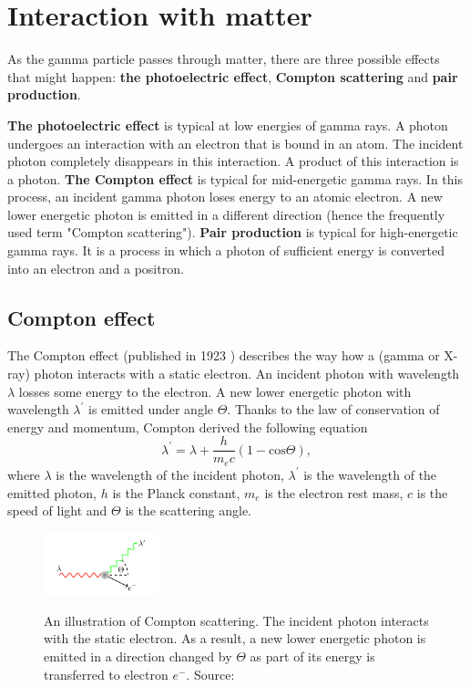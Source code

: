 \section{Interaction with matter}
As the gamma particle passes through matter, there are three possible effects that might happen:
\textbf{the photoelectric effect}, \textbf{Compton scattering} and \textbf{pair production}.

\textbf{The photoelectric effect} is typical at low energies of gamma rays. A photon undergoes an interaction with an electron that is bound in an atom. The incident photon completely disappears in this interaction. A product of this interaction is a photon.
\textbf{The Compton effect} is typical for mid-energetic gamma rays. In this process, an incident gamma photon loses energy to an atomic electron. A new lower energetic photon is emitted in a different direction (hence the frequently used term "Compton scattering").
\textbf{Pair production} is typical for high-energetic gamma rays. It is a process in which a photon of sufficient energy is converted into an electron and a positron.

\subsection{Compton effect}
The Compton effect (published in 1923 \cite{}) describes the way how a (gamma or X-ray) photon interacts with a static electron. An incident photon with wavelength $\lambda$ losses some energy to the electron. A new lower energetic photon with wavelength $\lambda^{\prime}$ is emitted under angle $\Theta$. Thanks to the law of conservation of energy and momentum, Compton derived the following equation
\begin{equation}
    \lambda^{\prime} = \lambda + \frac{h}{m_{e}c}(1-\mathrm{cos} \Theta),
\end{equation}
where $\lambda$ is the wavelength of the incident photon, $\lambda^{\prime}$ is the wavelength of the emitted photon, $h$ is the Planck constant, $m_{e}$ is the electron rest mass, $c$ is the speed of light and $\Theta$ is the scattering angle.

\begin{figure}[!h]
    \centering
    \includegraphics[width=0.3\textwidth]{./fig/photos/scattering.png}
    \label{fig:scattering}
    \caption{An illustration of Compton scattering. The incident photon interacts with the static electron. As a result, a new lower energetic photon is emitted in a direction changed by $\Theta$ as part of its energy is transferred to electron $e^{-}$. Source: \cite{baca2021gamma}}
\end{figure}

